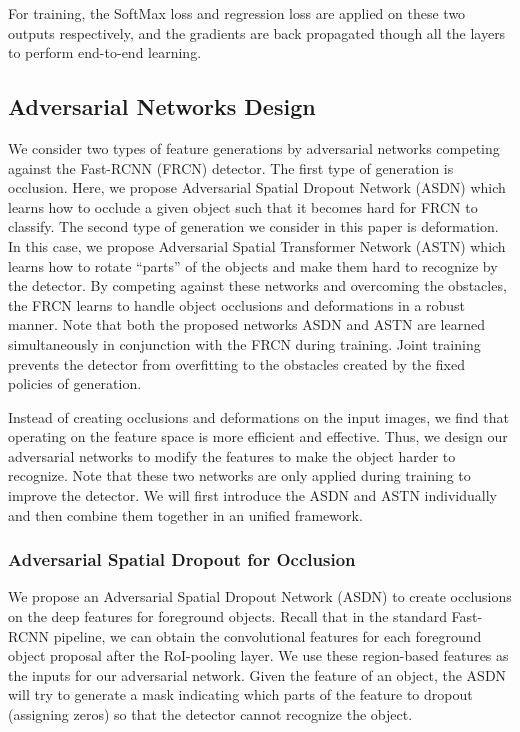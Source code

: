 For training, the SoftMax loss and regression loss are applied on these two outputs respectively, and the gradients are back propagated  though all the layers to perform end-to-end learning.

\subsection{Adversarial Networks Design}
We consider two types of feature generations by adversarial networks competing against the Fast-RCNN (FRCN) detector. The first type of generation is occlusion. Here, we propose Adversarial Spatial Dropout Network (ASDN) which learns how to occlude a given object such that it becomes hard for FRCN to classify. The second type of generation we consider in this paper is deformation. In this case, we propose Adversarial Spatial Transformer Network (ASTN) which learns how to rotate ``parts'' of the objects and make them hard to recognize by the detector. By competing against these networks and overcoming the obstacles, the FRCN learns  to handle object occlusions and deformations in a robust manner. Note that both the proposed networks ASDN and ASTN are learned simultaneously in conjunction with the FRCN during training. Joint training prevents the detector from overfitting to the obstacles created by the fixed policies of generation. 

Instead of creating occlusions and deformations on the input images, we find that operating on the feature space is more efficient and effective. Thus, we design our adversarial networks to modify the features to make the object harder to recognize. Note that these two networks are only applied during training to improve the detector. We will first introduce the ASDN and ASTN individually and then combine them together in an unified framework. 


\subsubsection{Adversarial Spatial Dropout for Occlusion}
We propose an Adversarial Spatial Dropout Network (ASDN) to create occlusions on the deep features for foreground objects. Recall that in the standard Fast-RCNN pipeline, we can obtain the convolutional features for each foreground object proposal after the RoI-pooling layer. We use these region-based features as the inputs for our adversarial network. Given the feature of an object, the ASDN will try to generate a mask indicating which parts of the feature to dropout (assigning zeros) so that the detector cannot recognize the object.


